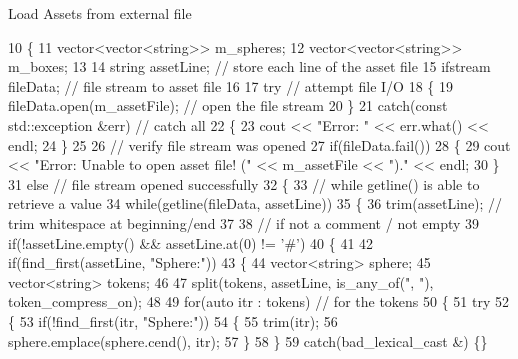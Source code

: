 Load Assets from external file 
\begin{DoxyCode}
10 \{
11     vector<vector<string>> m\_spheres;
12     vector<vector<string>> m\_boxes;
13 
14     \textcolor{keywordtype}{string} assetLine; \textcolor{comment}{// store each line of the asset file}
15     ifstream fileData; \textcolor{comment}{// file stream to asset file}
16 
17     \textcolor{keywordflow}{try} \textcolor{comment}{// attempt file I/O}
18     \{
19         fileData.open(m_assetFile); \textcolor{comment}{// open the file stream}
20     \}
21     \textcolor{keywordflow}{catch}(\textcolor{keyword}{const} std::exception &err) \textcolor{comment}{// catch all}
22     \{
23         cout << \textcolor{stringliteral}{"Error: "} << err.what() << endl;
24     \}
25 
26     \textcolor{comment}{// verify file stream was opened}
27     \textcolor{keywordflow}{if}(fileData.fail())
28     \{
29         cout << \textcolor{stringliteral}{"Error: Unable to open asset file! ("} << m_assetFile << \textcolor{stringliteral}{")."} << endl;
30     \}
31     \textcolor{keywordflow}{else} \textcolor{comment}{// file stream opened successfully}
32     \{
33         \textcolor{comment}{// while getline() is able to retrieve a value}
34         \textcolor{keywordflow}{while}(getline(fileData, assetLine))
35         \{
36             trim(assetLine); \textcolor{comment}{// trim whitespace at beginning/end}
37 
38             \textcolor{comment}{// if not a comment / not empty}
39             \textcolor{keywordflow}{if}(!assetLine.empty() && assetLine.at(0) != \textcolor{charliteral}{'#'})
40             \{
41 
42                 \textcolor{keywordflow}{if}(find\_first(assetLine, \textcolor{stringliteral}{"Sphere:"}))
43                 \{
44                     vector<string> sphere;
45                     vector<string> tokens;
46 
47                     split(tokens, assetLine, is\_any\_of(\textcolor{stringliteral}{", "}), token\_compress\_on);
48 
49                     \textcolor{keywordflow}{for}(\textcolor{keyword}{auto} itr : tokens) \textcolor{comment}{// for the tokens}
50                     \{
51                         \textcolor{keywordflow}{try}
52                         \{
53                             \textcolor{keywordflow}{if}(!find\_first(itr, \textcolor{stringliteral}{"Sphere:"}))
54                             \{
55                                 trim(itr);
56                                 sphere.emplace(sphere.cend(), itr);
57                             \}
58                         \}
59                         \textcolor{keywordflow}{catch}(bad\_lexical\_cast &) \{\}

\end{DoxyCode}
